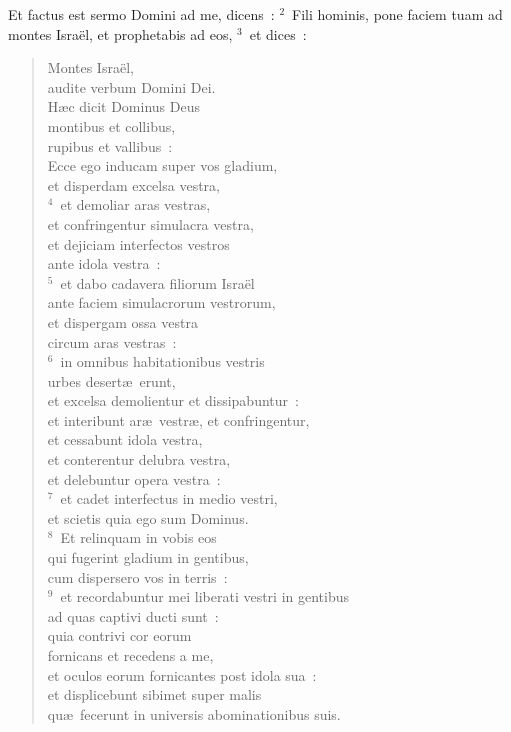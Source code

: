 \lettrine[lines=10,image=true,loversize=0.05,lraise=-0.03]{E}{}t factus est sermo Domini ad me, dicens~:
${}^{2}$~Fili hominis, pone faciem tuam ad montes Isra\"el, et prophetabis ad eos,
${}^{3}$~et dices~: \begin{flushleft}\begin{verse}Montes Isra\"el,\\ audite verbum Domini Dei.\\ H\ae c dicit Dominus Deus\\ montibus et collibus,\\ rupibus et vallibus~:\\ Ecce ego inducam super vos gladium,\\ et disperdam excelsa vestra,\\
${}^{4}$~et demoliar aras vestras,\\ et confringentur simulacra vestra,\\ et dejiciam interfectos vestros\\ ante idola vestra~:\\
${}^{5}$~et dabo cadavera filiorum Isra\"el\\ ante faciem simulacrorum vestrorum,\\ et dispergam ossa vestra\\ circum aras vestras~:\\
${}^{6}$~in omnibus habitationibus vestris\\ urbes desert\ae\ erunt,\\ et excelsa demolientur et dissipabuntur~:\\ et interibunt ar\ae\ vestr\ae , et confringentur,\\ et cessabunt idola vestra,\\ et conterentur delubra vestra,\\ et delebuntur opera vestra~:\\
${}^{7}$~et cadet interfectus in medio vestri,\\ et scietis quia ego sum Dominus.\\
${}^{8}$~Et relinquam in vobis eos\\ qui fugerint gladium in gentibus,\\ cum dispersero vos in terris~:\\
${}^{9}$~et recordabuntur mei liberati vestri in gentibus\\ ad quas captivi ducti sunt~:\\ quia contrivi cor eorum\\ fornicans et recedens a me,\\ et oculos eorum fornicantes post idola sua~:\\ et displicebunt sibimet super malis\\ qu\ae\ fecerunt in universis abominationibus suis.\\

\end{verse}
\end{flushleft}
